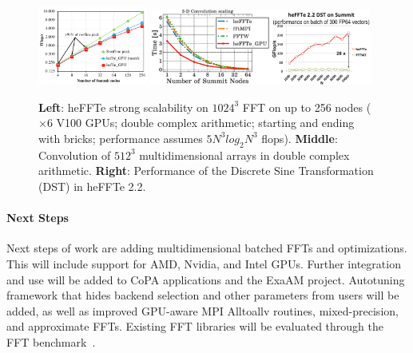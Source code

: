 \begin{figure}[htb]
   \centering
   \includegraphics[width=0.32\textwidth]{projects/2.3.3-MathLibs/2.3.3.13-CLOVER/heFFTeStrongScalability}
   \includegraphics[width=0.65\textwidth]{projects/2.3.3-MathLibs/2.3.3.13-CLOVER/heffte_conv_dst}
    \caption{\label{fig:fft-ecp-progress}
    {\bf Left}: heFFTe strong scalability on $1024^3$ 
                FFT on up to 256 nodes ($\times 6$ V100 GPUs;
                double complex arithmetic; starting and ending with bricks; 
                performance assumes $5 N^3 log_2 N^3$ flops).
    {\bf Middle}: Convolution of $512^3$ multidimensional arrays in double complex arithmetic.
    {\bf Right}: Performance of the Discrete Sine Transformation (DST) in heFFTe 2.2.
    }
\end{figure}


\paragraph{Next Steps}
Next steps of work are adding multidimensional batched FFTs and optimizations.
This will include support for AMD, Nvidia, and Intel GPUs.
Further integration and use will be added to CoPA applications and the ExaAM project.
Autotuning framework that hides backend selection and other parameters from users
will be added, as well as improved GPU-aware MPI Alltoallv routines, mixed-precision, 
and approximate FFTs. Existing FFT libraries will be evaluated through the FFT 
benchmark~\cite{fftbenchmark}.



